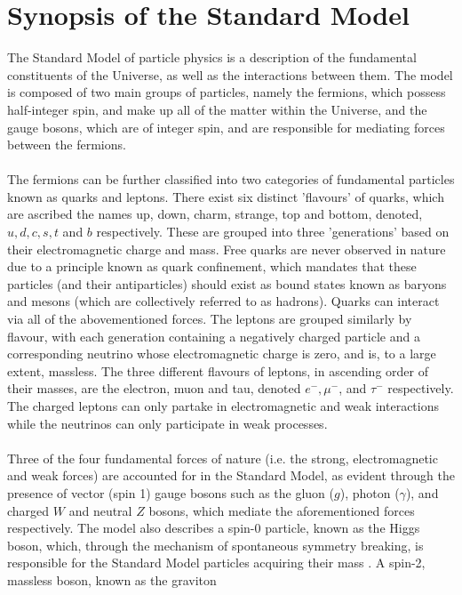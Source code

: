 \section{Synopsis of the Standard Model}
The Standard Model of particle physics is a description of the fundamental constituents of the Universe, as well as the interactions between them.
The model is composed of two main groups of particles, namely the fermions, which possess half-integer spin, and make up all of the 
matter within the Universe, and the gauge bosons, which are of integer spin, and are responsible for mediating forces between the fermions.\\
\\
The fermions can be further classified into two categories of fundamental particles known as quarks and leptons. There exist six distinct 'flavours' of quarks, which are
ascribed the names up, down, charm, strange, top and bottom, denoted, $u, d, c, s, t$ and $b$ respectively. These are grouped into three 'generations' based on their electromagnetic charge
and mass. Free quarks are never observed in nature due to a principle known as quark confinement, which mandates that these particles (and their antiparticles) should exist as bound states known as baryons and mesons
(which are collectively referred to as hadrons). Quarks can interact via all of the abovementioned forces. The leptons are grouped similarly by flavour, with each generation containing a negatively charged particle and a corresponding neutrino
whose electromagnetic charge is zero, and is, to a large extent, massless. The three different flavours of leptons, in ascending order of their masses, are the electron, muon and tau, denoted $e^{-}, \mu^{-}$, and $\tau^{-}$ respectively. The charged leptons
can only partake in electromagnetic and weak interactions while the neutrinos can only participate in weak processes.\\
\\
Three of the four fundamental forces of nature (i.e. the strong, electromagnetic and weak forces) are accounted for in the Standard Model, as evident through the presence of vector (spin 1) gauge bosons such as the gluon ($g$), photon ($\gamma$), and charged $W$ and neutral $Z$ bosons, 
which mediate the aforementioned forces respectively. The model also describes a spin-0 particle, known as the Higgs boson, which, through the mechanism of spontaneous symmetry breaking, is responsible for the Standard Model particles acquiring their mass \cite{ATLAS:2012znl}. A spin-2, massless boson, known as the graviton
